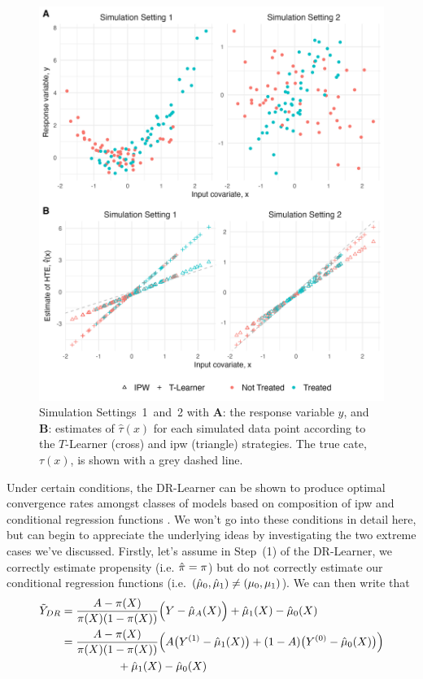 \documentclass[../thesis.tex]{subfiles}
\begin{document}
\begin{figure}[!tpb] 
\centering
\includegraphics[width=\textwidth]{figures/chapter4/comp_figure_without_dr.png}
\caption{Simulation Settings~1~and~2 with \textbf{A}: the response variable $y$, and \textbf{B}: estimates of $\hat{\tau}(x)$ for each simulated data point according to the $T$-Learner (cross) and \gls{ipw} (triangle) strategies. The true \gls{cate}, $\tau(x)$, is shown with a grey dashed line.  \label{fig:comp_t_ipw}}
\end{figure}
Under certain conditions, the DR-Learner can be shown to produce optimal convergence rates amongst classes of models based on composition of \gls{ipw} and conditional regression functions \citep{kennedy_towards_2022}. We won't go into these conditions in detail here, but can begin to appreciate the underlying ideas by investigating the two extreme cases we've discussed. Firstly, let's assume in Step~(1) of the DR-Learner, we correctly estimate propensity (i.e. $\hat{\pi} = \pi$) but do not correctly estimate our conditional regression functions (i.e. $(\hat{\mu}_0, \hat{\mu}_1) \neq (\mu_0, \mu_1)$). We can then write that 
\begin{align*}
    \Tilde{Y}_{DR} & =  \frac{A - {\pi}(X)}{{\pi}(X)(1-{\pi}(X))}\Big( Y - \hat{\mu}_A(X)\Big) + \hat{\mu}_1(X) - \hat{\mu}_0(X) \\
    & = \frac{A - {\pi}(X)}{{\pi}(X)(1-{\pi}(X))}\Big(A\big(Y^{(1)} - \hat{\mu}_1(X)\big) + (1-A)\big(Y^{(0)} - \hat{\mu}_0(X) \big)\Big) \\
    & \hspace{50pt} + \hat{\mu}_1(X) - \hat{\mu}_0(X)
\end{align*}
\end{document}
